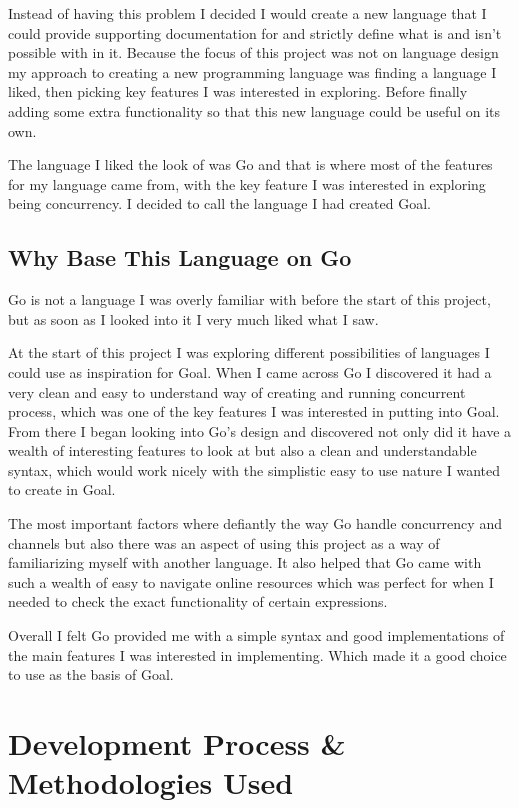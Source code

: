 Instead of having this problem I decided I would create a new language that I could provide supporting documentation for and strictly define what is and isn't possible with in it. Because the focus of this project was not on language design my approach to creating a new programming language was finding a language I liked, then picking key features I was interested in exploring. Before finally adding some extra functionality so that this new language could be useful on its own.

The language I liked the look of was Go and that is where most of the features for my language came from, with the key feature I was interested in exploring being concurrency. I decided to call the language I had created Goal.

\subsection{Why Base This Language on Go} 

Go is not a language I was overly familiar with before the start of this project, but as soon as I looked into it I very much liked what I saw. 

At the start of this project I was exploring different possibilities of languages I could use as inspiration for Goal. When I came across Go I discovered it had a very clean and easy to understand way of creating and running concurrent process, which was one of the key features I was interested in putting into Goal. From there I began looking into Go's design and discovered not only did it have a wealth of interesting features to look at but also a clean and understandable syntax, which would work nicely with the simplistic easy to use nature I wanted to create in Goal.

The most important factors where defiantly the way Go handle concurrency and channels but also there was an aspect of using this project as a way of familiarizing myself with another language. It also helped that Go came with such a wealth of easy to navigate online resources which was perfect for when I needed to check the exact functionality of certain expressions.

Overall I felt Go provided me with a simple syntax and good implementations of the main features I was interested in implementing. Which made it a good choice to use as the basis of Goal.

\section{Development Process \& Methodologies Used}

